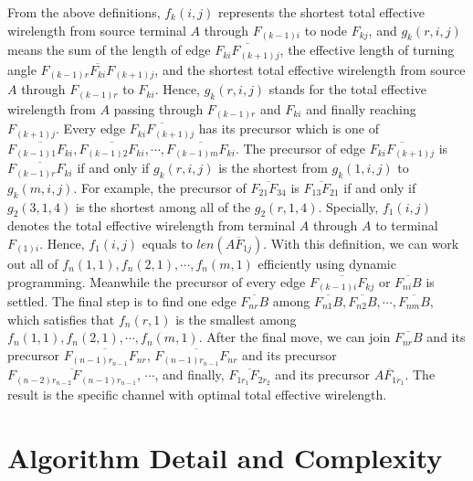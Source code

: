 \documentclass[journal]{IEEEtran}
\begin{document}


From the above definitions, $f_k(i, j)$ represents the shortest total effective wirelength from source terminal $A$ through $F_{(k-1)i}$ to node $F_{kj}$, and $g_k(r, i, j)$ means the sum of the length of edge $\overline{F_{ki}F_{(k+1)j}}$, the effective length of turning angle $\overline{F_{(k-1)r}F_{ki}F_{(k+1)j}}$, and the shortest total effective wirelength from source $A$ through $F_{(k-1)r}$ to $F_{ki}$. Hence, $g_k(r, i, j)$ stands for the total effective wirelength from $A$ passing through $F_{(k-1)r}$ and $F_{ki}$ and finally reaching $F_{(k+1)j}$. Every edge $\overline{F_{ki}F_{(k+1)j}}$ has its precursor which is one of $\overline{F_{(k-1)1}F_{ki}}, \overline{F_{(k-1)2}F_{ki}}, \cdots, \overline{F_{(k-1)m}F_{ki}}$. The precursor of edge $\overline{F_{ki}F_{(k+1)j}}$ is $\overline{F_{(k-1)r}F_{ki}}$ if and only if $g_k(r, i, j)$ is the shortest from $g_k(1, i, j)$ to $g_k(m, i, j)$. For example, the precursor of $\overline{F_{21}F_{34}}$ is $\overline{F_{13}F_{21}}$ if and only if $g_2(3, 1, 4)$ is the shortest among all of the $g_2(r, 1, 4)$. Specially, $f_1(i, j)$ denotes the total effective wirelength from terminal $A$ through $A$ to terminal $F_{(1)i}$. Hence, $f_1(i, j)$ equals to $len(\overline{AF_{1j}})$. With this definition, we can work out all of $f_n(1, 1), f_n(2, 1), \cdots, f_n(m, 1)$ efficiently using dynamic programming. 
Meanwhile the precursor of every edge $\overline{F_{(k-1)i}F_{kj}}$ or $\overline{F_{ni}B}$ is settled. The final step is to find one edge $\overline{F_{nr}B}$ among $\overline{F_{n1}B}, \overline{F_{n2}B}, \cdots, \overline{F_{nm}B}$, which satisfies that $f_n(r, 1)$ is the smallest among $f_n(1, 1), f_n(2, 1), \cdots, f_n(m, 1)$. After the final move, we can join $\overline{F_{nr}B}$ and its precursor $\overline{F_{(n-1)r_{n-1}}F_{nr}}$, $\overline{F_{(n-1)r_{n-1}}F_{nr}}$ and its precursor $\overline{F_{(n-2)r_{n-2}}F_{(n-1)r_{n-1}}}$, $\cdots$, and finally, $\overline{F_{1r_1}F_{2r_2}}$ and its precursor $\overline{AF_{1r_1}}$. The result is the specific channel with optimal total effective wirelength.

\section{Algorithm Detail and Complexity}
\label{sec:prca}
\end{document}
